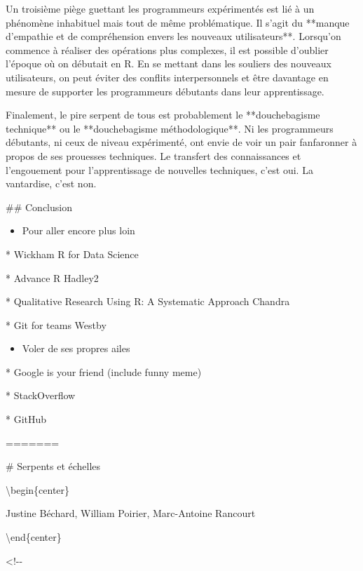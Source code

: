 \documentclass[
  letterpaper,
]{scrbook}
\providecommand{\tightlist}{%
  \setlength{\itemsep}{0pt}\setlength{\parskip}{0pt}}\usepackage{longtable,booktabs,array}
\begin{document}
Un troisième piège guettant les programmeurs expérimentés est lié à un
phénomène inhabituel mais tout de même problématique. Il s'agit du
**manque d'empathie et de compréhension envers les nouveaux
utilisateurs**. Lorsqu'on commence à réaliser des opérations plus
complexes, il est possible d'oublier l'époque où on débutait en R. En se
mettant dans les souliers des nouveaux utilisateurs, on peut éviter des
conflits interpersonnels et être davantage en mesure de supporter les
programmeurs débutants dans leur apprentissage.

Finalement, le pire serpent de tous est probablement le **douchebagisme
technique** ou le **douchebagisme méthodologique**. Ni les programmeurs
débutants, ni ceux de niveau expérimenté, ont envie de voir un pair
fanfaronner à propos de ses prouesses techniques. Le transfert des
connaissances et l'engouement pour l'apprentissage de nouvelles
techniques, c'est oui. La vantardise, c'est non.

\#\# Conclusion

\begin{itemize}
\tightlist
\item
  Pour aller encore plus loin
\end{itemize}

* Wickham R for Data Science

* Advance R Hadley2

* Qualitative Research Using R: A Systematic Approach Chandra

* Git for teams Westby

\begin{itemize}
\tightlist
\item
  Voler de ses propres ailes
\end{itemize}

* Google is your friend (include funny meme)

* StackOverflow

* GitHub

=======

\# Serpents et échelles

\textbackslash begin\{center\}

Justine Béchard, William Poirier, Marc-Antoine Rancourt

\textbackslash end\{center\}

\textless!-\/-
\end{document}
